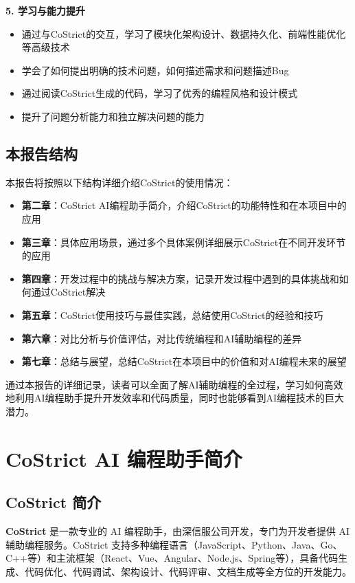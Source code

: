 ﻿\documentclass[12pt,a4paper]{article}
\begin{document}
\textbf{5. 学习与能力提升}
\begin{itemize}
    \item 通过与CoStrict的交互，学习了模块化架构设计、数据持久化、前端性能优化等高级技术
    \item 学会了如何提出明确的技术问题，如何描述需求和问题描述Bug
    \item 通过阅读CoStrict生成的代码，学习了优秀的编程风格和设计模式
    \item 提升了问题分析能力和独立解决问题的能力
\end{itemize}

\subsection{本报告结构}

本报告将按照以下结构详细介绍CoStrict的使用情况：

\begin{itemize}
    \item \textbf{第二章}：CoStrict AI编程助手简介，介绍CoStrict的功能特性和在本项目中的应用
    \item \textbf{第三章}：具体应用场景，通过多个具体案例详细展示CoStrict在不同开发环节的应用
    \item \textbf{第四章}：开发过程中的挑战与解决方案，记录开发过程中遇到的具体挑战和如何通过CoStrict解决
    \item \textbf{第五章}：CoStrict使用技巧与最佳实践，总结使用CoStrict的经验和技巧
    \item \textbf{第六章}：对比分析与价值评估，对比传统编程和AI辅助编程的差异
    \item \textbf{第七章}：总结与展望，总结CoStrict在本项目中的价值和对AI编程未来的展望
\end{itemize}

通过本报告的详细记录，读者可以全面了解AI辅助编程的全过程，学习如何高效地利用AI编程助手提升开发效率和代码质量，同时也能够看到AI编程技术的巨大潜力。

\section{CoStrict AI 编程助手简介}

\subsection{CoStrict 简介}

\textbf{CoStrict} 是一款专业的 AI 编程助手，由深信服公司开发，专门为开发者提供 AI 辅助编程服务。CoStrict 支持多种编程语言（JavaScript、Python、Java、Go、C++等）和主流框架（React、Vue、Angular、Node.js、Spring等），具备代码生成、代码优化、代码调试、架构设计、代码评审、文档生成等全方位的开发能力。
\end{document}
